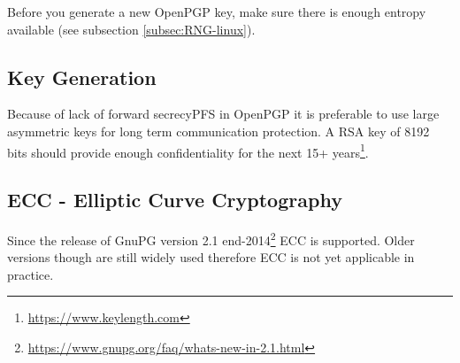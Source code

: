 
Before you generate a new OpenPGP key, make sure there is enough entropy available (see subsection \ref{subsec:RNG-linux}).

\subsection{Key Generation}
\gdef\currentsectionname{GPG}
\gdef\currentsubsectionname{GnuPG}
Because of lack of forward secrecy\ac{PFS} in OpenPGP it is preferable to use large asymmetric keys for long term
communication protection. A RSA key of 8192 bits should provide enough confidentiality for the next 15+ years\footnote{\url{https://www.keylength.com}}.



\subsection{ECC - Elliptic Curve Cryptography}
Since the release of GnuPG version 2.1 end-2014\footnote{\url{https://www.gnupg.org/faq/whats-new-in-2.1.html}} ECC is supported. Older versions though are still widely used therefore ECC is not yet applicable in practice. 












